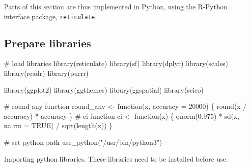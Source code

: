 \documentclass[]{article}
\newenvironment{Shaded}{}{}
\newcommand{\CommentTok}[1]{\textcolor[rgb]{0.00,0.50,0.00}{#1}}
\newcommand{\ControlFlowTok}[1]{\textcolor[rgb]{0.00,0.00,1.00}{#1}}
\newcommand{\DataTypeTok}[1]{#1}
\newcommand{\DecValTok}[1]{#1}
\newcommand{\FloatTok}[1]{#1}
\newcommand{\KeywordTok}[1]{\textcolor[rgb]{0.00,0.00,1.00}{#1}}
\newcommand{\NormalTok}[1]{#1}
\newcommand{\OperatorTok}[1]{#1}
\newcommand{\OtherTok}[1]{\textcolor[rgb]{1.00,0.25,0.00}{#1}}
\newcommand{\StringTok}[1]{\textcolor[rgb]{0.00,0.50,0.50}{#1}}
\begin{document}
Parts of this section are thus implemented in Python, using the R-Python interface package, \texttt{reticulate}.

\hypertarget{prepare-libraries-2}{%
\subsection{Prepare libraries}\label{prepare-libraries-2}}

\begin{Shaded}
\begin{Highlighting}[numbers=left,,]
\CommentTok{# load libraries}
\KeywordTok{library}\NormalTok{(reticulate)}
\KeywordTok{library}\NormalTok{(sf)}
\KeywordTok{library}\NormalTok{(dplyr)}
\KeywordTok{library}\NormalTok{(scales)}
\KeywordTok{library}\NormalTok{(readr)}
\KeywordTok{library}\NormalTok{(purrr)}

\KeywordTok{library}\NormalTok{(ggplot2)}
\KeywordTok{library}\NormalTok{(ggthemes)}
\KeywordTok{library}\NormalTok{(ggspatial)}
\KeywordTok{library}\NormalTok{(scico)}

\CommentTok{# round any function}
\NormalTok{round_any <-}\StringTok{ }\ControlFlowTok{function}\NormalTok{(x, }\DataTypeTok{accuracy =} \DecValTok{20000}\NormalTok{) \{}
  \KeywordTok{round}\NormalTok{(x }\OperatorTok{/}\StringTok{ }\NormalTok{accuracy) }\OperatorTok{*}\StringTok{ }\NormalTok{accuracy}
\NormalTok{\}}
\CommentTok{# ci function}
\NormalTok{ci <-}\StringTok{ }\ControlFlowTok{function}\NormalTok{(x) \{}
  \KeywordTok{qnorm}\NormalTok{(}\FloatTok{0.975}\NormalTok{) }\OperatorTok{*}\StringTok{ }\KeywordTok{sd}\NormalTok{(x, }\DataTypeTok{na.rm =} \OtherTok{TRUE}\NormalTok{) }\OperatorTok{/}\StringTok{ }\KeywordTok{sqrt}\NormalTok{(}\KeywordTok{length}\NormalTok{(x))}
\NormalTok{\}}

\CommentTok{# set python path}
\KeywordTok{use_python}\NormalTok{(}\StringTok{"/usr/bin/python3"}\NormalTok{)}
\end{Highlighting}
\end{Shaded}

Importing python libraries. These libraries need to be installed before use.
\end{document}
